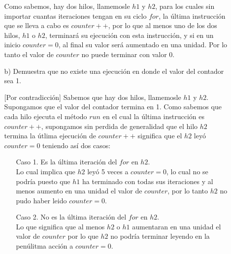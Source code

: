 \documentclass[12pt, letterpaper]{article}
\begin{document}
\begin{itemize}
\begin{itemize}
Como sabemos, hay dos hilos, llamemosle $h1$ y $h2$, para los cuales sin importar cuantas iteraciones tengan en su ciclo $for$, la última instrucción que se lleva a cabo es $counter++$, por lo que al menos uno de los dos hilos, $h1$ o $h2$, terminará su ejecución con esta instrucción, y si en un inicio $counter = 0$, al final su valor será aumentado en una unidad. Por lo tanto el valor de $counter$ no puede terminar con valor 0. 

\item[b) ] Demuestra que no existe una ejecución en donde el valor del contador sea 1.

[Por contradicción] Sabemos que hay dos hilos, llamemosle $h1$ y $h2$. Supongamos que el valor del contador termina en 1. Como sabemos que cada hilo ejecuta el método $run$ en el cual la última instrucción es $counter++$, supongamos sin perdida de generalidad que el hilo $h2$ termina la útlima ejecución de $counter++$ significa que el $h2$ leyó $counter = 0$ teniendo así dos casos: 
\begin{itemize}
\item[Caso 1. ] Es la última iteración del $for$ en $h2$.\\
Lo cual implica que $h2$ leyó 5 veces a $counter = 0$, lo cual no se podría puesto que $h1$ ha terminado con todas sus iteraciones y al menos aumento en una unidad el valor de $counter$, por lo tanto $h2$ no pudo haber leido $counter = 0$.

\item[Caso 2. ] No es la última iteración del $for$ en $h2$.\\
Lo que significa que al menos $h2$ o $h1$ aumentaran en una unidad el valor de $counter$ por lo que $h2$ no podría terminar leyendo en la penúlitma acción a $counter = 0$.
\end{itemize} 


\end{itemize}
\end{itemize}
\end{document}
